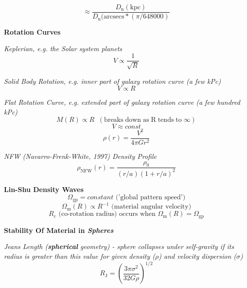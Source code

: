 \documentclass{spy}
\begin{document}
\begin{equation}
\approx \frac{D_\mathrm{n}(\mathrm{kpc})}{D_\mathrm{n}(\mathrm{arcsecs} * (\pi / 648000)}
\end{equation}




\textbf {Rotation Curves}

\textit {Keplerian, e.g. the Solar system planets}
\begin{equation}
V \propto \frac {1}{\sqrt{R}}
\end{equation}

\textit {Solid Body Rotation, e.g. inner part of galaxy rotation curve (a few kPc)}
\begin{equation}
V \propto R
\end{equation}

\textit {Flat Rotation Curve, e.g. extended part of galaxy rotation curve (a few hundred kPc)}
\begin{equation}
M(R) \propto R \; \; (\mathrm{breaks \; down \; as \; R \; tends \; to \;} \infty)
\end{equation}
\begin{equation}
V \approx const
\end{equation}
\begin{equation}
\rho(r) = \frac {V^2}{4 \pi G r^2}
\end{equation}

\textit {NFW (Navarro-Frenk-White, 1997) Density Profile}
\begin{equation}
\rho_\mathrm{NFW}(r) = \frac {\rho_\mathrm{0}}{(r/a)(1 + r/a)^2}  
\end{equation}

\textbf{Lin-Shu Density Waves}
\begin{equation}
\Omega_\mathrm{gp} = constant \text{ ('global pattern speed')}
\end{equation}
\begin{equation}
\Omega_\mathrm{m}(R) \propto R^{-1} \text{ (material angular velocity)}
\end{equation}
\begin{equation}
R_\mathrm{c}  \text{ (co-rotation radius) occurs when } \Omega_\mathrm{m}(R) = \Omega_\mathrm{gp}
\end{equation}

\textbf {Stability Of Material in \textit{Spheres}}

\textit {Jeans Length  (\textbf{spherical} geometry) - sphere collapses under self-gravity if its radius is greater than this value for given density (\(\rho\)) and velocity dispersion (\(\sigma\)) }
\begin{equation}
R_\mathrm{J} = \left( \frac{3 \pi \sigma^2}{32 G \rho} \right)^{1/2}
\end{equation}
\end{document}

